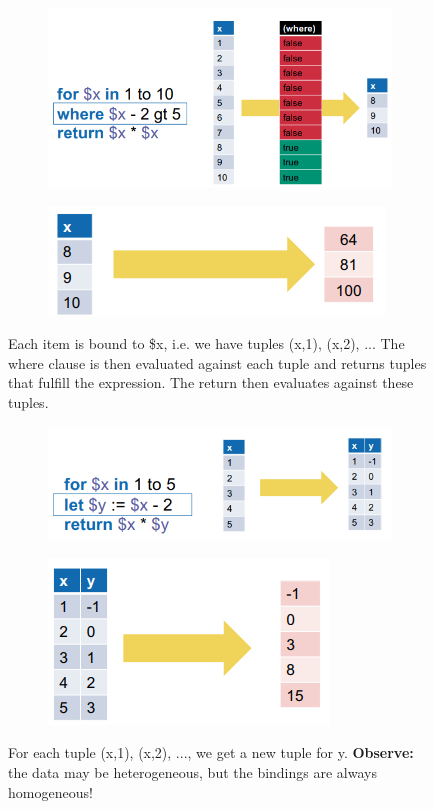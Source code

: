 \documentclass[11pt,oneside,a4paper]{article}
\begin{document}
{\begin{figure}[hb!]
	\centering
	\begin{subfigure}[t]{.5\textwidth}
		\centering
		\includegraphics[width=0.5\linewidth]{figures/queryingtrees_tuples_11}
	\end{subfigure}%
	\begin{subfigure}[t]{.5\textwidth}
		\centering
		\includegraphics[width=0.6\linewidth]{figures/queryingtrees_tuples_12}
	\end{subfigure}
	\caption{Each item is bound to \$x, i.e. we have tuples (x,1), (x,2), ... The where clause is then evaluated against each tuple and returns tuples that fulfill the expression. The return then evaluates against these tuples.}
\end{figure}

\begin{figure}[hb!]
	\centering
	\begin{subfigure}[t]{.5\textwidth}
		\centering
		\includegraphics[width=0.7\linewidth]{figures/queryingtrees_tuples_21}
	\end{subfigure}%
	\begin{subfigure}[t]{.5\textwidth}
		\centering
		\includegraphics[width=0.4\linewidth]{figures/queryingtrees_tuples_22}
	\end{subfigure}
	\caption{For each tuple (x,1), (x,2), ..., we get a new tuple for y. \textbf{Observe:} the data may be heterogeneous, but the bindings are always homogeneous!}
\end{figure}

}
\end{document}
